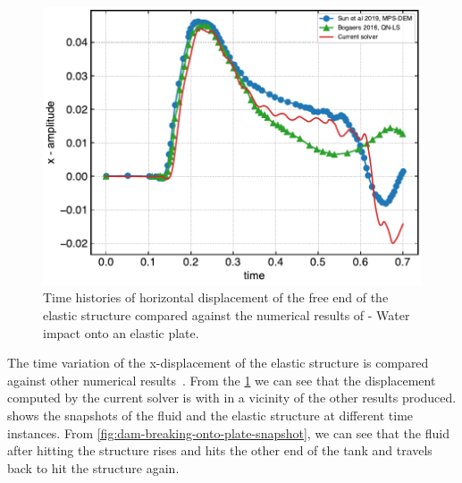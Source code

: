 \documentclass[10pt, conference]{FMFP2022}
\begin{document}
\begin{figure}
  \centering
  \includegraphics[scale=0.45]{figures/sun_2019_dam_breaking_flow_impacting_an_elastic_plate/x_amplitude}
  \caption{Time histories of horizontal displacement of the free end of the
    elastic structure compared against the numerical results of
    \cite{sun2019fully,bogaers2016evaluation}- Water impact onto an elastic
    plate.}
\label{fig:water-impact-plate-deflection-quantitative}
\end{figure}
The time variation of the x-displacement of the elastic structure is compared
against other numerical results~\cite{sun2019fully,bogaers2016evaluation}. From
the \cref{fig:water-impact-plate-deflection-quantitative} we can see that the
displacement computed by the current solver is with in a vicinity of the other
results produced.  shows the
snapshots of the fluid and the elastic structure at different time instances.
From \cref{fig:dam-breaking-onto-plate-snapshot}, we can see that the fluid
after hitting the structure rises and hits the other end of the tank and travels
back to hit the structure again.
\end{document}
